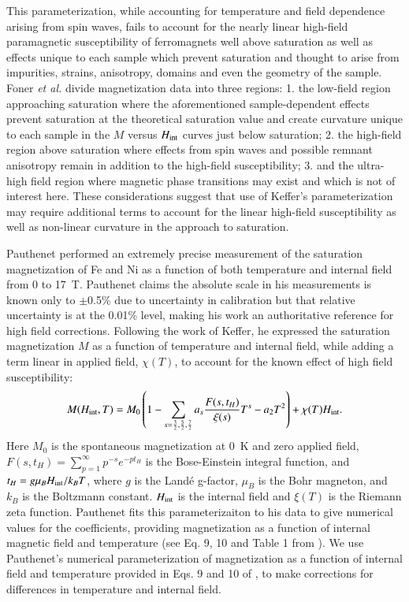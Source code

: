 \documentclass[preprint,12pt]{elsarticle}
\begin{document}
This parameterization, while accounting for temperature and field dependence arising from spin waves, fails to account for the nearly linear high-field paramagnetic susceptibility of ferromagnets well above saturation as well as effects unique to each sample which prevent saturation and thought to arise from impurities,  strains, anisotropy, domains and even the geometry of the sample\cite{Foner1969}. Foner {\it et al.} divide magnetization data into three regions: 1. the low-field region approaching saturation where the aforementioned sample-dependent effects prevent saturation at the theoretical saturation value and create curvature unique to each sample in the $M$ versus $H_{\rm{int}}$ curves just below saturation; 2. the high-field region above saturation where effects from spin waves and possible remnant anisotropy remain in addition to the high-field susceptibility; 3. and the ultra-high field region where magnetic phase transitions may exist and which is not of interest here\cite{Foner1969}. These considerations suggest that use of Keffer's parameterization may require additional terms to account for the linear high-field susceptibility as well as non-linear curvature in the approach to saturation. 

Pauthenet performed an extremely precise measurement of the saturation magnetization of Fe and Ni as a function of both temperature and internal field from 0 to 17~T. Pauthenet claims the absolute scale in his measurements is known only to $\pm$0.5\% due to uncertainty in calibration but that relative uncertainty is at the 0.01\% level, making his work an authoritative reference for high field corrections. Following the work of Keffer, he expressed the saturation magnetization $M$ as a function of temperature and internal field, while adding a term linear in applied field, $\chi(T)$, to account for the known effect of high field susceptibility:\cite{Keffer1966,PauthenetMar1982,PauthenetNov1982}
\begin{equation}
M(H_{\rm int}, T)=M_0\left(1-\sum_{s=\frac{3}{2},\frac{5}{2},\frac{7}{2}}a_s\frac{F(s,t_H)}{\xi(s)}T^s-a_2T^2\right) +\chi(T)H_{\rm int}.
\label{eq:pauthenet}
\end{equation}
Here $M_0$ is the spontaneous magnetization at 0~K and zero applied field, $F(s,t_H)=\sum_{p=1}^\infty p^{-s}e^{-pt_H}$ is the Bose-Einstein integral function, and $t_H=g\mu_BH_{\rm int}/k_BT$, where $g$ is the Land\'e g-factor, $\mu_B$ is the Bohr magneton, and $k_B$ is the Boltzmann constant. $H_{\rm int}$ is the internal field and  $\xi(T)$ is the Riemann zeta function. Pauthenet fits this parameterizaiton to his data to give numerical values for the coefficients, providing magnetization as a function of internal magnetic field and temperature (see Eq. 9, 10 and Table 1 from \cite{PauthenetMar1982}). We use Pauthenet's numerical parameterization of magnetization as a function of internal field and temperature provided in Eqs. 9 and 10 of \cite{PauthenetMar1982}, to make corrections for differences in temperature and internal field.
\end{document}
